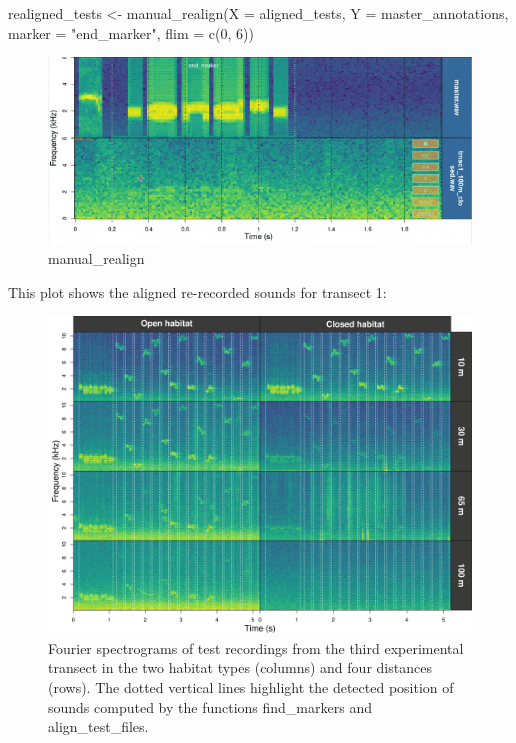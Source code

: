 \documentclass[
  letterpaper,
  DIV=11,
  numbers=noendperiod]{scrartcl}
\newenvironment{Shaded}{\begin{snugshade}}{\end{snugshade}}
\newcommand{\AttributeTok}[1]{\textcolor[rgb]{0.49,0.56,0.16}{#1}}
\newcommand{\DecValTok}[1]{\textcolor[rgb]{0.25,0.63,0.44}{#1}}
\newcommand{\FunctionTok}[1]{\textcolor[rgb]{0.02,0.16,0.49}{#1}}
\newcommand{\NormalTok}[1]{\textcolor[rgb]{0.00,0.44,0.13}{#1}}
\newcommand{\OtherTok}[1]{\textcolor[rgb]{0.00,0.44,0.13}{#1}}
\newcommand{\StringTok}[1]{\textcolor[rgb]{0.25,0.44,0.63}{#1}}
\begin{document}
\begin{Shaded}
\begin{Highlighting}[numbers=left,,]
\NormalTok{realigned\_tests }\OtherTok{\textless{}{-}} \FunctionTok{manual\_realign}\NormalTok{(}\AttributeTok{X =}\NormalTok{ aligned\_tests, }\AttributeTok{Y =}\NormalTok{ master\_annotations,}
    \AttributeTok{marker =} \StringTok{"end\_marker"}\NormalTok{, }\AttributeTok{flim =} \FunctionTok{c}\NormalTok{(}\DecValTok{0}\NormalTok{, }\DecValTok{6}\NormalTok{))}
\end{Highlighting}
\end{Shaded}

\begin{figure}

{\centering \includegraphics{../output/manual_realign.gif}

}

\caption{manual\_realign}

\end{figure}

This plot shows the aligned re-recorded sounds for transect 1:

\begin{figure}

{\centering \includegraphics{../output/spectrograms_by_habitat_and_distance_transect2.png}

}

\caption{Fourier spectrograms of test recordings from the third
experimental transect in the two habitat types (columns) and four
distances (rows). The dotted vertical lines highlight the detected
position of sounds computed by the functions find\_markers and
align\_test\_files.}

\end{figure}
\end{document}
